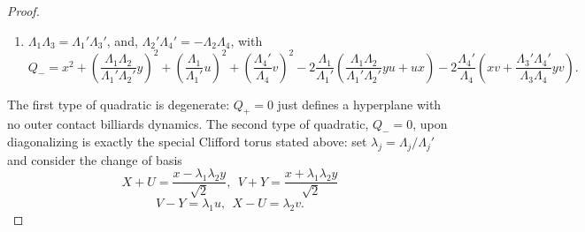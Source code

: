 \documentclass{article}
\begin{document}
\begin{proof}
\begin{enumerate}
         \item $\Lambda_1\Lambda_3 = \Lambda_1'\Lambda_3'$, and, $\Lambda_2'\Lambda_4' =- \Lambda_2\Lambda_4$, with %
         \[ Q_- = x^2 +\left( \frac{\Lambda_1\Lambda_2}{\Lambda_1'\Lambda_2'}y\right)^2 + \left( \frac{\Lambda_1}{\Lambda_1'}u\right)^2 + \left( \frac{\Lambda_4'}{\Lambda_4}v\right)^2 - 2\frac{\Lambda_1}{\Lambda_1'}\left( \frac{\Lambda_1\Lambda_2}{\Lambda_1'\Lambda_2'}yu + ux  \right) -  2\frac{\Lambda_4'}{\Lambda_4}\left( xv + \frac{\Lambda_3'\Lambda_4'}{\Lambda_3\Lambda_4}yv  \right).  \]     
     \end{enumerate}
The first type of quadratic is degenerate: $Q_+ = 0$ just defines a hyperplane with no 
outer contact billiards dynamics. The second type of quadratic, $Q_- = 0$, upon 
diagonalizing is exactly the special Clifford torus stated above: set $\lambda_j = 
\Lambda_j/\Lambda_j'$ and consider the change of basis
\[ X + U = \frac{x-\lambda_1\lambda_2 y}{\sqrt{2}}, ~~V + Y = \frac{x + \lambda_1\lambda_2 y}{\sqrt{2}} \]
\[ V-Y = \lambda_1 u, ~~X-U = \lambda_2 v.\]


\end{proof}
\end{document}
